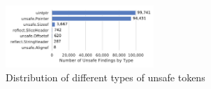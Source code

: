 \begin{figure}[!t]
    \centering
    \includegraphics[width=0.5\textwidth]{assets/plots/chapter4/distribution-unsafe-types.pdf}
    \caption{Distribution of different types of unsafe tokens}
    \label{fig:unsafe-tokens-distribution}
\end{figure}